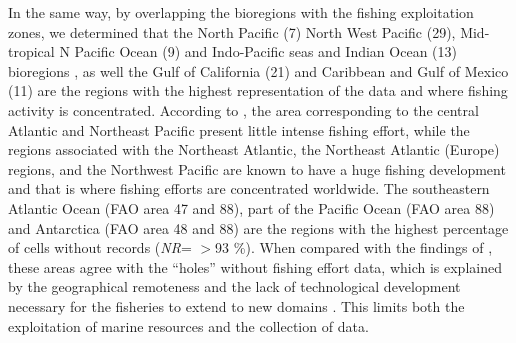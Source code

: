 \documentclass[12pt,authoryear]{elsarticle}
\begin{document}
In the same way, by overlapping the bioregions with the fishing exploitation zones, we determined that the North Pacific (7) North West Pacific (29), Mid-tropical N Pacific Ocean (9) and Indo-Pacific seas and Indian Ocean (13) bioregions , as well the Gulf of California (21) and Caribbean and Gulf of Mexico (11) are the regions with the highest representation of the data and where fishing activity is concentrated. According to \citep{kroodsma2018}, the area corresponding to the central Atlantic and Northeast Pacific present little intense fishing effort, while the regions associated with the Northeast Atlantic, the Northeast Atlantic (Europe) regions, and the Northwest Pacific are known to have a huge fishing development and that is where fishing efforts are concentrated worldwide. The southeastern Atlantic Ocean (FAO area 47 and 88), part of the Pacific Ocean (FAO area 88) and Antarctica (FAO area 48 and 88) are the regions with the highest percentage of cells without records (\textit{NR}= \(>\)93 \%). When compared with the findings of \citep{kroodsma2018}, these areas agree with the “holes” without fishing effort data, which is explained by the geographical remoteness and the lack of technological development necessary for the fisheries to extend to new domains \citep{visalli2020}. This limits both the exploitation of marine resources and the collection of data.
\end{document}
